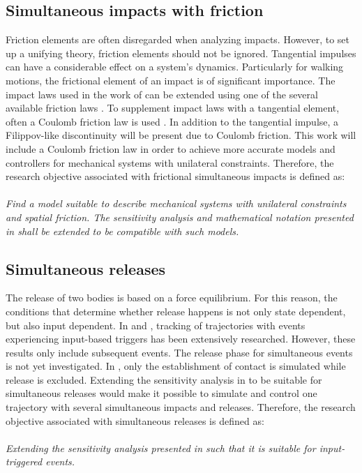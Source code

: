 \documentclass[../DC2019003Bouma.tex]{subfiles}
\begin{document}
\subsection*{Simultaneous impacts with friction}
Friction elements are often disregarded when analyzing impacts. However, to set up a unifying theory, friction elements should not be ignored. Tangential impulses can have a considerable effect on a system's dynamics. Particularly for walking motions, the frictional element of an impact is of significant importance. The impact laws used in the work of \cite{Chen2018a} can be extended using one of the several available friction laws \cite{Leine2008}. To supplement impact laws with a tangential element, often a Coulomb friction law is used \cite{Glocker2014a}. In addition to the tangential impulse, a Filippov-like discontinuity will be present due to Coulomb friction. This work will include a Coulomb friction law in order to achieve more accurate models and controllers for mechanical systems with unilateral constraints. Therefore, the research objective associated with frictional simultaneous impacts is defined as:\\\\
\textit{Find a model suitable to describe mechanical systems with unilateral constraints and spatial friction. The sensitivity analysis and mathematical notation presented in \cite{Rijnen2018a} shall be extended to be compatible with such models.}

\subsection*{Simultaneous releases}
The release of two bodies is based on a force equilibrium. For this reason, the conditions that determine whether release happens is not only state dependent, but also input dependent. In \cite{Rijnen2016} and \cite{Rijn2016}, tracking of trajectories with events experiencing input-based triggers has been extensively researched. However, these results only include subsequent events. The release phase for simultaneous events is not yet investigated. In \cite{Chen2018a}, only the establishment of contact is simulated while release is excluded. Extending the sensitivity analysis in \cite{Chen2018a} to be suitable for simultaneous releases would make it possible to simulate and control one trajectory with several simultaneous impacts and releases. Therefore, the research objective associated with simultaneous releases is defined as:\\\\
\textit{Extending the sensitivity analysis presented in \cite{Rijnen2018a} such that it is suitable for input-triggered events.}
\end{document}
